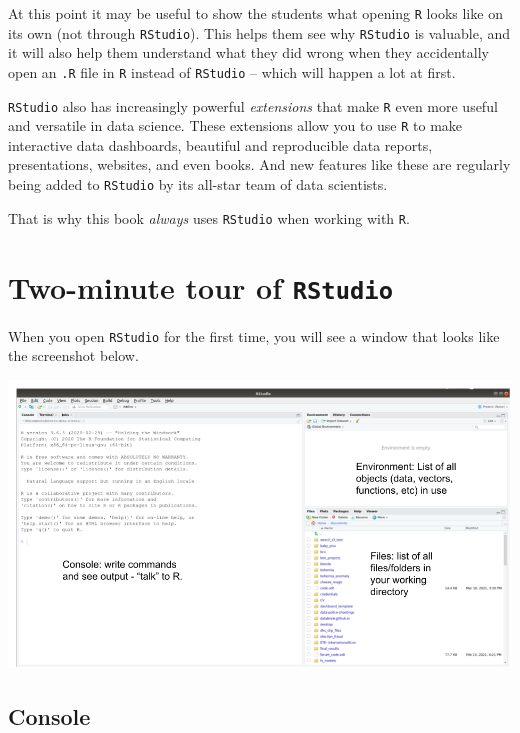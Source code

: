 \documentclass[
]{book}
\begin{document}
At this point it may be useful to show the students what opening \texttt{R} looks like on its own (not through \texttt{RStudio}). This helps them see why \texttt{RStudio} is valuable, and it will also help them understand what they did wrong when they accidentally open an \texttt{.R} file in \texttt{R} instead of \texttt{RStudio} -- which will happen a lot at first.

\texttt{RStudio} also has increasingly powerful \emph{extensions} that make \texttt{R} even more useful and versatile in data science. These extensions allow you to use \texttt{R} to make interactive data dashboards, beautiful and reproducible data reports, presentations, websites, and even books. And new features like these are regularly being added to \texttt{RStudio} by its all-star team of data scientists.

That is why this book \emph{always} uses \texttt{RStudio} when working with \texttt{R}.

\hypertarget{two-minute-tour-of-rstudio}{%
\section*{\texorpdfstring{Two-minute tour of \texttt{RStudio}}{Two-minute tour of RStudio}}\label{two-minute-tour-of-rstudio}}

When you open \texttt{RStudio} for the first time, you will see a window that looks like the screenshot below.

\includegraphics{img/rstudio_windows.png}

\hypertarget{console}{%
\subsection*{Console}\label{console}}
\end{document}
